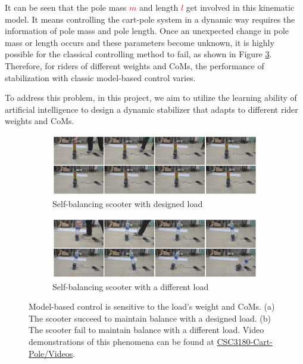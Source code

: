 \documentclass[10pt,a4paper]{article}
\begin{document}
It can be seen that the pole mass \textcolor{red}{$m$} and length \textcolor{red}{$l$} get involved in this kinematic model. It means controlling the cart-pole system in a dynamic way requires the information of pole mass and pole length. Once an unexpected change in pole mass or length occurs and these parameters become unknown, it is highly possible for the classical controlling method to fail, as shown in Figure \ref{fig:different_rider}.
Therefore, for riders of different weights and CoMs, the performance of stabilization with classic model-based control varies. 

To address this problem, in this project, we aim to utilize the learning ability of artificial intelligence to design a dynamic stabilizer that adapts to different rider weights and CoMs.


\begin{figure}
	\centering
	\begin{subfigure}[b]{1\textwidth}
		\centering
		\includegraphics[width=1\linewidth]{figure/success}
		\caption{Self-balancing scooter with designed load}
		\label{fig:success}
	\end{subfigure}
	\hfill
	\begin{subfigure}[b]{1\textwidth}
		\centering
		\includegraphics[width=1\linewidth]{figure/fail}
		\caption{Self-balancing scooter with a different load}
		\label{fig:fail}
	\end{subfigure}
	\caption{Model-based control is sensitive to the load's weight and CoMs. (a) The scooter succeed to maintain balance with a designed load. (b) The scooter fail to maintain balance with a different load. Video demonstrations of this phenomena can be found at \href{https://1drv.ms/f/s!AmutmbT5H6Pkm0sNJx83Q54XewmB?e=HUkzYK}{CSC3180-Cart-Pole/Videos}.}
	\label{fig:different_rider}
\end{figure}
\end{document}
